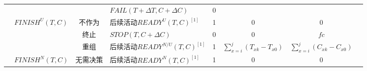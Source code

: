 \begin{table}[htbp]
\begin{threeparttable}
\begin{tabular}{llllllll}
            \multicolumn{1}{|c|}{} 
            &       
            & \multicolumn{1}{|c}{} 
            & \multicolumn{1}{|l}{$FAIL(T+\Delta T,C+\Delta C)$} 
            & \multicolumn{1}{|c}{0} 
            & \multicolumn{1}{|c}{} 
            & \multicolumn{1}{|c|}{} \\
            \cline{2-7}
            
            \multicolumn{1}{|c|}{} 
            & \multirow{3}{*}{$FINISH^U(T,C)$} 
            & \multicolumn{1}{|c}{不作为} 
            & \multicolumn{1}{|l}{后续活动$READY^U(T,C)^{[1]}$} 
            & \multicolumn{1}{|c}{1} 
            & \multicolumn{1}{|c}{0} 
            & \multicolumn{1}{|c|}{0} \\
            \cline{3-7}
            
            \multicolumn{1}{|c|}{} 
            &       
            & \multicolumn{1}{|c}{终止} 
            & \multicolumn{1}{|l}{$STOP(T,C+\Delta C)$} 
            & \multicolumn{1}{|c}{0} 
            & \multicolumn{1}{|c}{0} 
            & \multicolumn{1}{|c|}{$fc$} \\
            \cline{3-7}
            
            \multicolumn{1}{|c|}{} 
            &       
            & \multicolumn{1}{|c}{重组} 
            & \multicolumn{1}{|l}{后续活动$READY^{N/U}(T,C)^[1]$} 
            & \multicolumn{1}{|c}{1} 
            & \multicolumn{1}{|c}{$\sum\limits_{x = i}^j {({T_{xk}} - {T_{x0}})} $} 
            & \multicolumn{1}{|c|}{$\sum\limits_{x = i}^j {({C_{xk}} - {C_{x0}})} $}  \\
            \cline{2-7}
            
            \multicolumn{1}{|c|}{} 
            & $FINISH^N(T,C)$
            & \multicolumn{1}{|c}{无需决策} 
            & \multicolumn{1}{|l}{后续活动$READY^N(T,C)^[1]$} 
            & \multicolumn{1}{|c}{1} 
            & \multicolumn{1}{|c}{0} 
            & \multicolumn{1}{|c|}{0} \\
            \bottomrule
            

\end{tabular}
\end{threeparttable}
\end{table}
